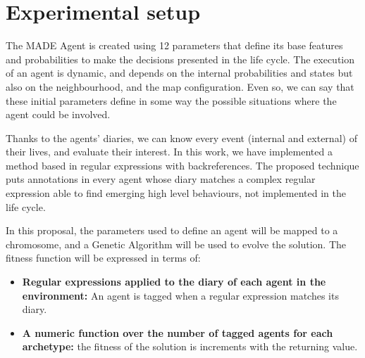 \documentclass[runningheads]{llncs}
\begin{document}


\section{Experimental setup}
\label{sec:experimentalsetup}

The MADE Agent is created using 12 parameters %
that define its base features and probabilities to make the decisions presented in the life cycle. The execution of an agent is dynamic, and depends on the internal probabilities and states but also on the neighbourhood, and the map configuration. Even so, we can say that these initial parameters define in some way the possible situations where the agent could be involved.

Thanks to the agents' diaries, we can know every event (internal and external) of their lives, and evaluate their interest. In this work, we have implemented a method based in regular expressions with backreferences. The proposed technique puts annotations in every agent whose diary matches a complex regular expression able to find emerging high level behaviours, not implemented in the life cycle. 

In this proposal, the parameters used to define an agent will be mapped to a chromosome, and a Genetic Algorithm will be used to evolve the solution. The fitness function will be expressed in terms of:

\begin{itemize}
\item \textbf{Regular expressions applied to the diary of each agent in the environment:} An agent is tagged when a regular expression matches its diary.
\item \textbf{A numeric function over the number of tagged agents for each archetype:} the fitness of the solution is increments with the returning value.
\end{itemize}
\end{document}
